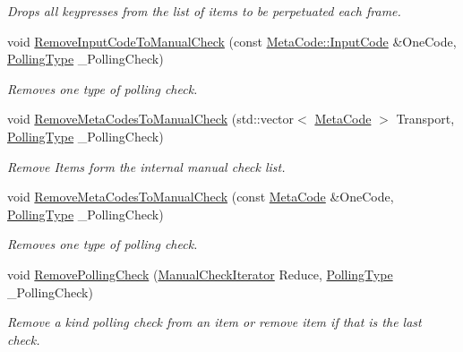 \begin{DoxyCompactItemize}
\begin{DoxyCompactList}\small\item\em Drops all keypresses from the list of items to be perpetuated each frame. \item\end{DoxyCompactList}\item 
void \hyperlink{structMezzanine_1_1internal_1_1EventManagerInternalData_a2efd493359f7abd3eef0ba90de5c4897}{RemoveInputCodeToManualCheck} (const \hyperlink{classMezzanine_1_1MetaCode_a3b5633f0145bf3287cf53a3f05b5563c}{MetaCode::InputCode} \&OneCode, \hyperlink{structMezzanine_1_1internal_1_1EventManagerInternalData_a4179a167c7f67babd5aa4902dc279027}{PollingType} \_\-PollingCheck)
\begin{DoxyCompactList}\small\item\em Removes one type of polling check. \item\end{DoxyCompactList}\item 
void \hyperlink{structMezzanine_1_1internal_1_1EventManagerInternalData_aac0654ac47c339352be4cda056af52c0}{RemoveMetaCodesToManualCheck} (std::vector$<$ \hyperlink{classMezzanine_1_1MetaCode}{MetaCode} $>$ Transport, \hyperlink{structMezzanine_1_1internal_1_1EventManagerInternalData_a4179a167c7f67babd5aa4902dc279027}{PollingType} \_\-PollingCheck)
\begin{DoxyCompactList}\small\item\em Remove Items form the internal manual check list. \item\end{DoxyCompactList}\item 
void \hyperlink{structMezzanine_1_1internal_1_1EventManagerInternalData_ae80f07727a2a0d335bd03bf0e07dd1e4}{RemoveMetaCodesToManualCheck} (const \hyperlink{classMezzanine_1_1MetaCode}{MetaCode} \&OneCode, \hyperlink{structMezzanine_1_1internal_1_1EventManagerInternalData_a4179a167c7f67babd5aa4902dc279027}{PollingType} \_\-PollingCheck)
\begin{DoxyCompactList}\small\item\em Removes one type of polling check. \item\end{DoxyCompactList}\item 
void \hyperlink{structMezzanine_1_1internal_1_1EventManagerInternalData_a031eec688cb8a7381f958772441af3a9}{RemovePollingCheck} (\hyperlink{structMezzanine_1_1internal_1_1EventManagerInternalData_a0e7ecff8902c7881b006e63584f639b4}{ManualCheckIterator} Reduce, \hyperlink{structMezzanine_1_1internal_1_1EventManagerInternalData_a4179a167c7f67babd5aa4902dc279027}{PollingType} \_\-PollingCheck)
\begin{DoxyCompactList}\small\item\em Remove a kind polling check from an item or remove item if that is the last check. \item\end{DoxyCompactList}\end{DoxyCompactItemize}
